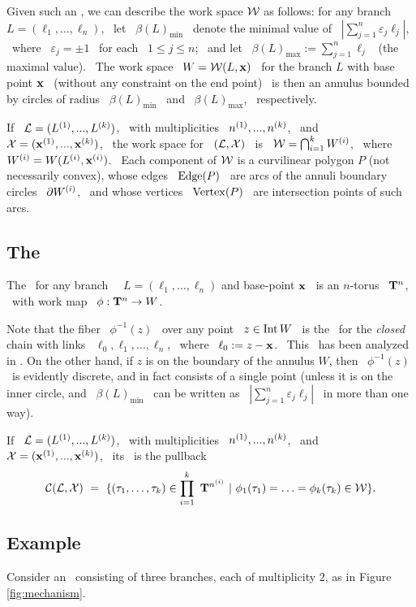 Given such an \smech, we can describe the work space $\mathcal{W}$ as
follows: for any branch \ \ $L=(\ell_{1},\dotsc,\ell_{n})$, \ let
\ $\beta(L)_{\min}$ \ denote the minimal value of \
$|\sum_{j=1}^{n}\varepsilon_{j}\ell_{j}|$, \ where \
$\varepsilon_{j}=\pm 1$ \ for each \ $1\leq j\leq n$; \ and let \
$\beta(L)_{\max}:=\sum_{j=1}^{n}\ell_{j}$ \ (the maximal value). \
The work space \ $W=\mathcal{W}(L,\mathbf{x})$ \ for the branch $L$ with base
point $\mathbf{x}$ \ (without any constraint on the end point) \ is then
an annulus bounded by circles of radius \ $\beta(L)_{\min}$ \ and
\ $\beta(L)_{\max}$, \ respectively.

If  \ $\mathcal{L}=(L\sp{({1})},...,L\sp{({k})})$, \ with multiplicities \
$n\sp{({1})},...,n\sp{({k})}$, \ and \ $\mathcal{X}=(\mathbf{x}\sp{({1})},...,\mathbf{x}\sp{({k})})$, \ the work
space for \ $(\mathcal{L},\mathcal{X})$ \ is \ $\mathcal{W}=\bigcap_{i=1}^kW\sp{({i})}$, \
where \ $W\sp{({i})}=W(L\sp{({i})},\mathbf{x}\sp{({i})})$. \ Each component of $\mathcal{W}$ is a
curvilinear polygon $P$ (not necessarily convex), whose edges \
$\operatorname{Edge}(P)$ \ are arcs of the annuli boundary circles \
$\partial W\sp{({i})}$, \ and whose vertices \ $\operatorname{Vertex}(P)$ \ are
intersection points of such arcs.

\subsection{The \cspace}
\label{scs}\stepcounter{thm}
\newnot{1-7}
The \cspace\ for any branch \ \ $L=(\ell_{1},\dotsc,\ell_{n})$ and
base-point $\mathbf{x}$ \ is an $n$-torus \ ${\mathbf{T}^{n}}$, \ with work map \
$\phi:{\mathbf{T}^{n}}\to W$.

Note that the fiber \ $\phi^{-1}(z)$ \ over any point \ $z\in\operatorname{Int}
W$ \ is the \cspace\ for the \emph{closed} chain with links \
$\ell_{0},\ell_{1},\dotsc,\ell_{n}$, \ where \ $\ell_{0}:=z-\mathbf{x}$.
\ This \cspace\ has been analyzed in \cite{HR}. On the other hand,
if $z$ is on the boundary of the annulus $W$, then \
$\phi^{-1}(z)$ \ is evidently discrete, and in fact consists of a
single point (unless it is on the inner circle, and \
$\beta(L)_{\min}$ \ can be written as \
$|\sum_{j=1}^{n}\varepsilon_{j}\ell_{j}|$ \ in more than one way).

If \ $\mathcal{L}=(L\sp{({1})},...,L\sp{({k})})$, \ with multiplicities \
$n\sp{({1})},...,n\sp{({k})}$, \ and \ $\mathcal{X}=(\mathbf{x}\sp{({1})},...,\mathbf{x}\sp{({k})})$, \ its
\cspace\ is the pullback $$
\mathcal{C}(\mathcal{L},\mathcal{X})~=~\{(\tau_{1},\dotsc,\tau_{k})\in\prod_{i=1}^{k}~{\mathbf{T}^{n\sp{({i})}}}~
|\ \phi_{1}(\tau_{1})=\dotsc=\phi_{k}(\tau_{k})\in\mathcal{W}\}.
$$

\subsection{Example}\label{exa:lens}\stepcounter{thm}
Consider an \smech\ consisting of three branches, each of
multiplicity $2$, as in Figure \ref{fig:mechanism}.

